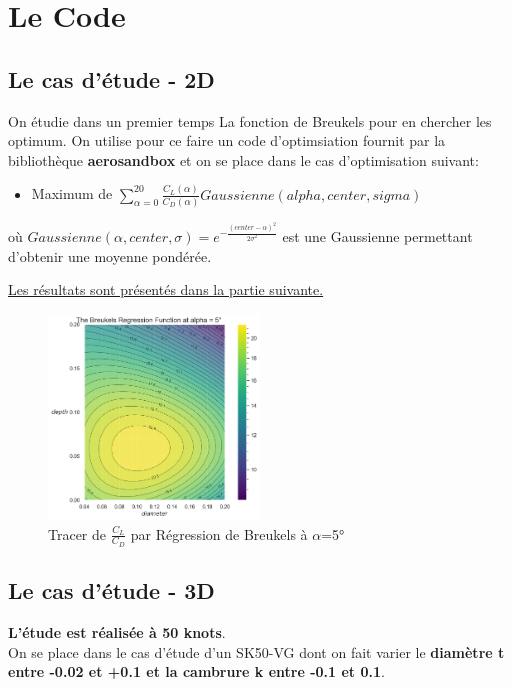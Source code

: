 \documentclass[conference]{IEEEtran}
\begin{document}
\section{Le Code }

\subsection{Le cas d'étude - 2D} 

On étudie dans un premier temps La fonction de Breukels pour en chercher les optimum. On utilise pour ce faire un code d'optimsiation fournit par la bibliothèque \textbf{aerosandbox} et on se place dans le cas d'optimisation suivant: 
\begin{itemize}
    \item Maximum de $\sum_{\alpha = 0}^{20}\frac{C_L(\alpha)}{C_D(\alpha)} Gaussienne(alpha, center, sigma) $
\end{itemize}

    où $Gaussienne(\alpha, center, \sigma) = e^{-\frac{(center - \alpha)^2}{2\sigma^2}}$ est une Gaussienne permettant d'obtenir une moyenne pondérée. 

\underline{Les résultats sont présentés dans la partie suivante.}
\begin{figure}[H]
    \centering
    \includegraphics[width=0.5\textwidth]{Pics/breukels.png}  
    \caption{Tracer de $\frac{C_L}{C_D}$ par Régression de Breukels à $\alpha$=5°}
    \label{fig:breukels}
\end{figure}


\subsection{Le cas d'étude - 3D} 

\textbf{L'étude est réalisée à 50 knots}.\\
On se place dans le cas d'étude d'un SK50-VG dont on fait varier le \textbf{diamètre t entre -0.02 et +0.1 et la cambrure k entre -0.1 et 0.1}. \\
    
\end{document}
